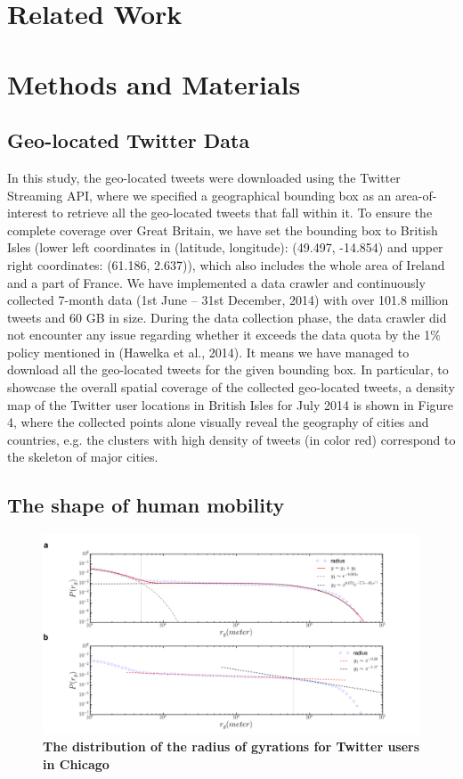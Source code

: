 \documentclass[a4paper,11pt]{article}
\begin{document}
\section*{Related Work}

\section*{Methods and Materials}

\subsection*{Geo-located Twitter Data}
In this study, the geo-located tweets were downloaded using the Twitter Streaming API, where we specified a geographical bounding box as an area-of-interest to retrieve all the geo-located tweets that fall within it.
To ensure the complete coverage over Great Britain, we have set the bounding box to British Isles (lower left coordinates in (latitude, longitude): (49.497, -14.854) and upper right coordinates: (61.186, 2.637)), which also includes the whole area of Ireland and a part of France.
We have implemented a data crawler and continuously collected 7-month data (1st June – 31st December, 2014) with over 101.8 million tweets and 60 GB in size.
During the data collection phase, the data crawler did not encounter any issue regarding whether it exceeds the data quota by the 1$\%$ policy mentioned in (Hawelka et al., 2014).
It means we have managed to download all the geo-located tweets for the given bounding box.
In particular, to showcase the overall spatial coverage of the collected geo-located tweets, a density map of the Twitter user locations in British Isles for July 2014 is shown in Figure 4, where the collected points alone visually reveal the geography of cities and countries, e.g. the clusters with high density of tweets (in color red) correspond to the skeleton of major cities.
  
\subsection*{The shape of human mobility}


\begin{figure}[ht]
	\includegraphics[width=1.0\linewidth]{./figure/gyration_chicago}
	\caption{{\bf The distribution of the radius of gyrations for Twitter users in Chicago}}
	\label{Fig_gyration}
\end{figure}
\end{document}
